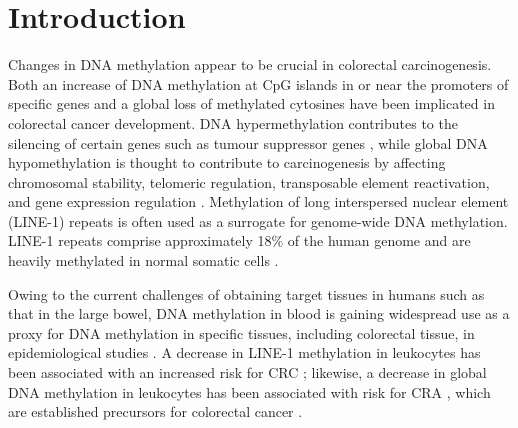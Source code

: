 \newpage 
 
\section*{Introduction} %
\noindent Changes in DNA methylation appear to be crucial in colorectal carcinogenesis. Both an increase of DNA methylation at CpG islands in or near the promoters of specific genes \cite{c51,c52} and a global loss of methylated cytosines \cite{c53} have been implicated in colorectal cancer development. DNA hypermethylation contributes to the silencing of certain genes such as tumour suppressor genes \cite{c54}, while global DNA hypomethylation is thought to contribute to carcinogenesis by affecting chromosomal stability, telomeric regulation, transposable element reactivation, and gene expression regulation \cite{c55}. Methylation of long interspersed nuclear element (LINE-1) repeats is often used as a surrogate for genome-wide DNA methylation. LINE-1 repeats comprise approximately 18\% of the human genome and are heavily methylated in normal somatic cells \cite{c56}.

\noindent Owing to the current challenges of obtaining target tissues in humans such as that in the large bowel, DNA methylation in blood is gaining widespread use as a proxy for DNA methylation in specific tissues, including colorectal tissue, in epidemiological studies \cite{c57,c510}. A decrease in LINE-1 methylation in leukocytes has been associated with an increased risk for CRC \cite{c511}; likewise, a decrease in global DNA methylation in leukocytes has been associated with risk for CRA \cite{c57,c58}, which are established precursors for colorectal cancer \cite{c512,c514}.

